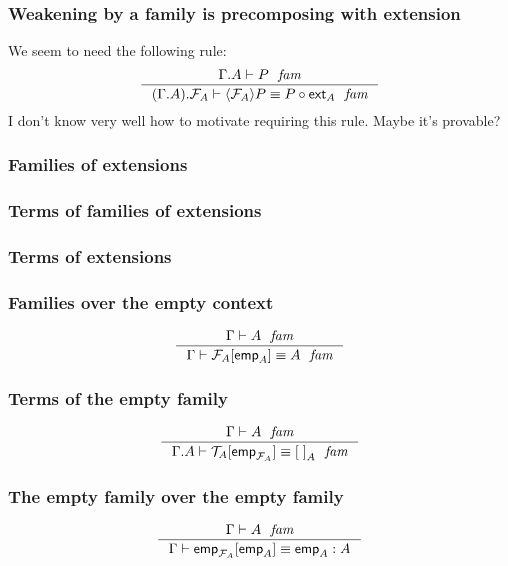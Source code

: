 \subsubsection{Weakening by a family is precomposing with extension}
We seem to need the following rule:
\begin{equation*}
\inference
  { \jfam{{\Gamma}{A}}{P}
    }
  { \jfameq
      {{{\Gamma}{A}}{\mfam{A}}}
      {\ctxwk{\mfam{A}}{P}}
      {\jcomp{}{\tfext{A}}{P}}
    }
\end{equation*}
I don't know very well how to motivate requiring this rule. Maybe it's provable?

\subsubsection{Families of extensions}

\subsubsection{Terms of families of extensions}

\subsubsection{Terms of extensions}

\subsubsection{Families over the empty context}
\begin{equation*}
\inference
  { \jfam{\Gamma}{A}
    }
  { \jfameq{\Gamma}{\subst{\tfemp{A}}{\mfam{A}}}{A}
    }
\end{equation*}

\subsubsection{Terms of the empty family}
\begin{equation*}
\inference
  { \jfam{\Gamma}{A}
    }
  { \jfameq{{\Gamma}{A}}{\subst{\tfemp{\mfam{A}}}{\mtm{A}}}{\emptyf[A]}
    }
\end{equation*}

\subsubsection{The empty family over the empty family}
\begin{equation*}
\inference
  { \jfam{\Gamma}{A}
    }
  { \jtermeq{\Gamma}{A}{\subst{\tfemp{A}}{\tfemp{\mfam{A}}}}{\tfemp{A}}
    }
\end{equation*}

